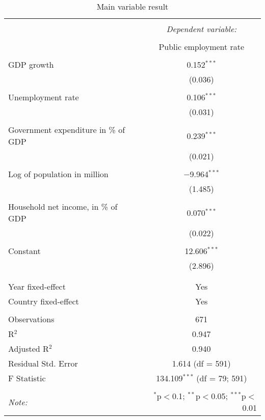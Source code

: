 
\begin{table}[!htbp] \centering 
  \caption{Main variable result} 
  \label{} 
\begin{tabular}{@{\extracolsep{5pt}}lc} 
\\[-1.8ex]\hline 
\hline \\[-1.8ex] 
 & \multicolumn{1}{c}{\textit{Dependent variable:}} \\ 
\cline{2-2} 
\\[-1.8ex] & Public employment rate \\ 
\hline \\[-1.8ex] 
 GDP growth & 0.152$^{***}$ \\ 
  & (0.036) \\ 
  & \\ 
 Unemployment rate & 0.106$^{***}$ \\ 
  & (0.031) \\ 
  & \\ 
 Government expenditure in \% of GDP & 0.239$^{***}$ \\ 
  & (0.021) \\ 
  & \\ 
 Log of population in million & $-$9.964$^{***}$ \\ 
  & (1.485) \\ 
  & \\ 
 Household net income, in \% of GDP & 0.070$^{***}$ \\ 
  & (0.022) \\ 
  & \\ 
 Constant & 12.606$^{***}$ \\ 
  & (2.896) \\ 
  & \\ 
\hline \\[-1.8ex] 
Year fixed-effect & Yes \\ 
Country fixed-effect & Yes \\ 
\hline \\[-1.8ex] 
Observations & 671 \\ 
R$^{2}$ & 0.947 \\ 
Adjusted R$^{2}$ & 0.940 \\ 
Residual Std. Error & 1.614 (df = 591) \\ 
F Statistic & 134.109$^{***}$ (df = 79; 591) \\ 
\hline 
\hline \\[-1.8ex] 
\textit{Note:}  & \multicolumn{1}{r}{$^{*}$p$<$0.1; $^{**}$p$<$0.05; $^{***}$p$<$0.01} \\ 
\end{tabular} 
\end{table} 
